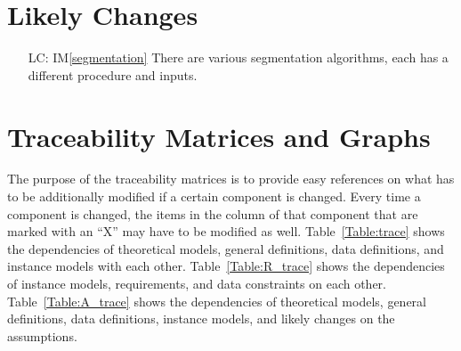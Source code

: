 \documentclass[12pt]{article}
\newcommand{\iref}[1]{IM\ref{#1}}
\newcounter{lcnum} %
\begin{document}
\section{Likely Changes}    

\noindent \begin{itemize}

\item[LC\refstepcounter{lcnum}\thelcnum\label{LC_seg_algorithm}:] \iref{segmentation} There are various segmentation algorithms, each has a different procedure and inputs.
	
\end{itemize}


\section{Traceability Matrices and Graphs}

The purpose of the traceability matrices is to provide easy references on what
has to be additionally modified if a certain component is changed.  Every time a
component is changed, the items in the column of that component that are marked
with an ``X'' may have to be modified as well.  Table~\ref{Table:trace} shows the
dependencies of theoretical models, general definitions, data definitions, and
instance models with each other. Table~\ref{Table:R_trace} shows the
dependencies of instance models, requirements, and data constraints on each
other. Table~\ref{Table:A_trace} shows the dependencies of theoretical models,
general definitions, data definitions, instance models, and likely changes on
the assumptions.



\end{document}
